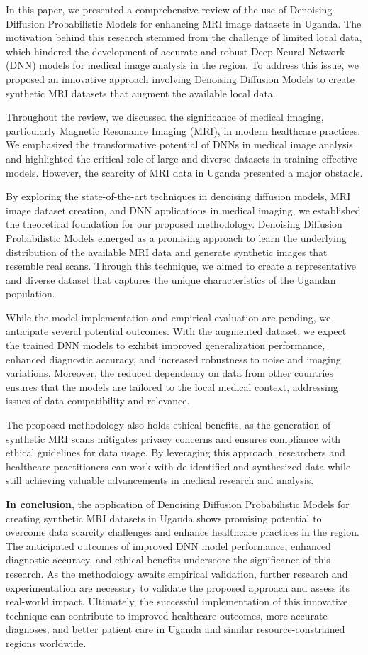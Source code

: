 In this paper, we presented a comprehensive review of the use of Denoising Diffusion Probabilistic Models for enhancing MRI image datasets in Uganda. The motivation behind this research stemmed from the challenge of limited local data, which hindered the development of accurate and robust Deep Neural Network (DNN) models for medical image analysis in the region. To address this issue, we proposed an innovative approach involving Denoising Diffusion Models to create synthetic MRI datasets that augment the available local data.

Throughout the review, we discussed the significance of medical imaging, particularly Magnetic Resonance Imaging (MRI), in modern healthcare practices. We emphasized the transformative potential of DNNs in medical image analysis and highlighted the critical role of large and diverse datasets in training effective models. However, the scarcity of MRI data in Uganda presented a major obstacle.

By exploring the state-of-the-art techniques in denoising diffusion models, MRI image dataset creation, and DNN applications in medical imaging, we established the theoretical foundation for our proposed methodology. Denoising Diffusion Probabilistic Models emerged as a promising approach to learn the underlying distribution of the available MRI data and generate synthetic images that resemble real scans. Through this technique, we aimed to create a representative and diverse dataset that captures the unique characteristics of the Ugandan population.

While the model implementation and empirical evaluation are pending, we anticipate several potential outcomes. With the augmented dataset, we expect the trained DNN models to exhibit improved generalization performance, enhanced diagnostic accuracy, and increased robustness to noise and imaging variations. Moreover, the reduced dependency on data from other countries ensures that the models are tailored to the local medical context, addressing issues of data compatibility and relevance.

The proposed methodology also holds ethical benefits, as the generation of synthetic MRI scans mitigates privacy concerns and ensures compliance with ethical guidelines for data usage. By leveraging this approach, researchers and healthcare practitioners can work with de-identified and synthesized data while still achieving valuable advancements in medical research and analysis.

{\bf In conclusion}, the application of Denoising Diffusion Probabilistic Models for creating synthetic MRI datasets in Uganda shows promising potential to overcome data scarcity challenges and enhance healthcare practices in the region. The anticipated outcomes of improved DNN model performance, enhanced diagnostic accuracy, and ethical benefits underscore the significance of this research. As the methodology awaits empirical validation, further research and experimentation are necessary to validate the proposed approach and assess its real-world impact. Ultimately, the successful implementation of this innovative technique can contribute to improved healthcare outcomes, more accurate diagnoses, and better patient care in Uganda and similar resource-constrained regions worldwide.


